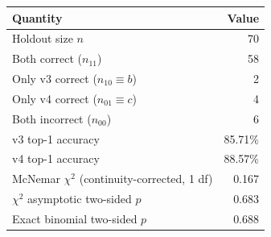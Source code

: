 \begin{tabular}{lr}
\toprule
Quantity & Value \\
\midrule
Holdout size $n$ & 70 \\
Both correct ($n_{11}$) & 58 \\
Only v3 correct ($n_{10} \equiv b$) & 2 \\
Only v4 correct ($n_{01} \equiv c$) & 4 \\
Both incorrect ($n_{00}$) & 6 \\
v3 top-1 accuracy & 85.71\% \\
v4 top-1 accuracy & 88.57\% \\
McNemar $\chi^2$ (continuity-corrected, 1 df) & 0.167 \\
$\chi^2$ asymptotic two-sided $p$ & 0.683 \\
Exact binomial two-sided $p$ & 0.688 \\
\bottomrule
\end{tabular}
